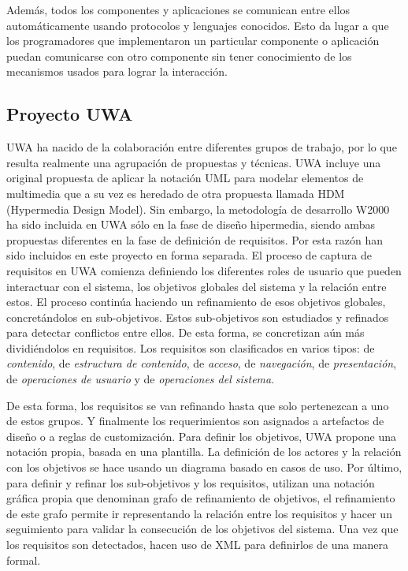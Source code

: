 Además, todos los componentes y aplicaciones se comunican entre ellos automáticamente usando protocolos y lenguajes conocidos. Esto da lugar a que los programadores que implementaron un particular componente o aplicación puedan comunicarse con otro componente sin tener conocimiento de los mecanismos usados para lograr la interacción.


\subsection{Proyecto UWA}

UWA ha nacido de la colaboración entre diferentes grupos de trabajo, por lo que resulta realmente una agrupación de propuestas y técnicas. UWA incluye una original propuesta de aplicar la notación UML para modelar elementos de multimedia que a su vez es heredado de otra propuesta llamada HDM (Hypermedia Design Model)\cite{HDM11}. Sin embargo, la metodología de desarrollo W2000 ha sido incluida en UWA sólo en la fase de diseño hipermedia, siendo ambas propuestas diferentes en la fase de definición de requisitos. Por esta razón han sido incluidos en este proyecto en forma separada. El proceso de captura de requisitos en UWA\cite{UWA32} comienza definiendo los diferentes roles de usuario que pueden interactuar con el sistema, los objetivos globales del sistema y la relación entre estos. El proceso continúa haciendo un refinamiento de esos objetivos globales, concretándolos en sub-objetivos. Estos sub-objetivos son estudiados y refinados para detectar conflictos entre ellos. De esta forma, se concretizan aún más dividiéndolos en requisitos. Los
requisitos son clasificados en varios tipos: de \textit{contenido}, de \textit{estructura de contenido}, de \textit{acceso}, de \textit{navegación}, de \textit{presentación}, de \textit{operaciones de usuario} y de
\textit{operaciones del sistema}. 

De esta forma, los requisitos se van refinando hasta que solo pertenezcan a uno de estos grupos. Y finalmente los requerimientos son asignados a artefactos de diseño o a reglas de customización.
Para definir los objetivos, UWA propone una notación propia, basada en una plantilla. La definición de los actores y la relación con los objetivos se hace usando un diagrama basado en casos de uso. Por último,
para definir y refinar los sub-objetivos y los requisitos, utilizan una notación gráfica propia que denominan grafo de refinamiento de objetivos, el refinamiento de este grafo permite ir representando la relación entre los requisitos y hacer un seguimiento para validar la consecución de los objetivos del sistema. Una vez que los requisitos son detectados, hacen uso de XML para definirlos de una manera formal.



